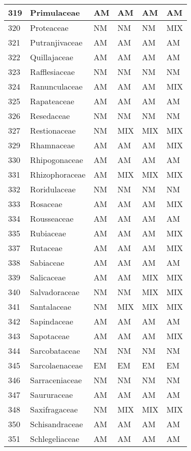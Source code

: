 \documentclass[]{article}
\begin{document}
\begin{longtable}{l|l|l|l|l|l}
\hline
319 & Primulaceae & AM & AM & AM & AM\\
\hline
320 & Proteaceae & NM & NM & NM & MIX\\
\hline
321 & Putranjivaceae & AM & AM & AM & AM\\
\hline
322 & Quillajaceae & AM & AM & AM & AM\\
\hline
323 & Rafflesiaceae & NM & NM & NM & NM\\
\hline
324 & Ranunculaceae & AM & AM & AM & MIX\\
\hline
325 & Rapateaceae & AM & AM & AM & AM\\
\hline
326 & Resedaceae & NM & NM & NM & NM\\
\hline
327 & Restionaceae & NM & MIX & MIX & MIX\\
\hline
329 & Rhamnaceae & AM & AM & AM & MIX\\
\hline
330 & Rhipogonaceae & AM & AM & AM & AM\\
\hline
331 & Rhizophoraceae & AM & MIX & MIX & MIX\\
\hline
332 & Roridulaceae & NM & NM & NM & NM\\
\hline
333 & Rosaceae & AM & AM & AM & MIX\\
\hline
334 & Rousseaceae & AM & AM & AM & AM\\
\hline
335 & Rubiaceae & AM & AM & AM & MIX\\
\hline
337 & Rutaceae & AM & AM & AM & MIX\\
\hline
338 & Sabiaceae & AM & AM & AM & AM\\
\hline
339 & Salicaceae & AM & AM & MIX & MIX\\
\hline
340 & Salvadoraceae & NM & NM & MIX & MIX\\
\hline
341 & Santalaceae & NM & MIX & MIX & MIX\\
\hline
342 & Sapindaceae & AM & AM & AM & AM\\
\hline
343 & Sapotaceae & AM & AM & AM & MIX\\
\hline
344 & Sarcobataceae & NM & NM & NM & NM\\
\hline
345 & Sarcolaenaceae & EM & EM & EM & EM\\
\hline
346 & Sarraceniaceae & NM & NM & NM & NM\\
\hline
347 & Saururaceae & AM & AM & AM & AM\\
\hline
348 & Saxifragaceae & NM & MIX & MIX & MIX\\
\hline
350 & Schisandraceae & AM & AM & AM & AM\\
\hline
351 & Schlegeliaceae & AM & AM & AM & AM\\

\end{longtable}
\end{document}
